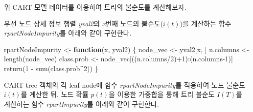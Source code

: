 \documentclass[
]{book}
\newenvironment{Shaded}{\begin{snugshade}}{\end{snugshade}}
\newcommand{\AttributeTok}[1]{\textcolor[rgb]{0.77,0.63,0.00}{#1}}
\newcommand{\ControlFlowTok}[1]{\textcolor[rgb]{0.13,0.29,0.53}{\textbf{#1}}}
\newcommand{\DecValTok}[1]{\textcolor[rgb]{0.00,0.00,0.81}{#1}}
\newcommand{\FunctionTok}[1]{\textcolor[rgb]{0.00,0.00,0.00}{#1}}
\newcommand{\NormalTok}[1]{#1}
\newcommand{\OtherTok}[1]{\textcolor[rgb]{0.56,0.35,0.01}{#1}}
\newcommand{\SpecialCharTok}[1]{\textcolor[rgb]{0.00,0.00,0.00}{#1}}
\newcommand{\StringTok}[1]{\textcolor[rgb]{0.31,0.60,0.02}{#1}}
\begin{document}
위 CART 모델 데이터를 이용하여 트리의 불순도를 계산해보자.

우선 노드 상세 정보 행렬 \emph{yval2}의 \emph{x}번째 노드의 불순도(\(i(t)\))를 계산하는 함수 \emph{rpartNodeImpurity}를 아래와 같이 구현한다.

\begin{Shaded}
\begin{Highlighting}[]
\NormalTok{rpartNodeImpurity }\OtherTok{\textless{}{-}} \ControlFlowTok{function}\NormalTok{(x, yval2) \{}
\NormalTok{  node\_vec }\OtherTok{\textless{}{-}}\NormalTok{ yval2[x, ]}
\NormalTok{  n.columns }\OtherTok{\textless{}{-}} \FunctionTok{length}\NormalTok{(node\_vec)}
\NormalTok{  class.prob }\OtherTok{\textless{}{-}}\NormalTok{ node\_vec[((n.columns}\SpecialCharTok{/}\DecValTok{2}\NormalTok{)}\SpecialCharTok{+}\DecValTok{1}\NormalTok{)}\SpecialCharTok{:}\NormalTok{(n.columns}\DecValTok{{-}1}\NormalTok{)]}
  \FunctionTok{return}\NormalTok{(}\DecValTok{1} \SpecialCharTok{{-}} \FunctionTok{sum}\NormalTok{(class.prob}\SpecialCharTok{\^{}}\DecValTok{2}\NormalTok{))}
\NormalTok{\}}
\end{Highlighting}
\end{Shaded}

CART tree 객체의 각 leaf node에 함수 \emph{rpartNodeImpurity}를 적용하여 노드 불순도 \(i(t)\)를 계산한 뒤, 노드 확률 \(p(t)\)을 이용한 가중합을 통해 트리 불순도 \(I(T)\)를 계산하는 함수 \emph{rpartImpurity}를 아래와 같이 구현한다.

\begin{Shaded}
\end{Shaded}
\end{document}
